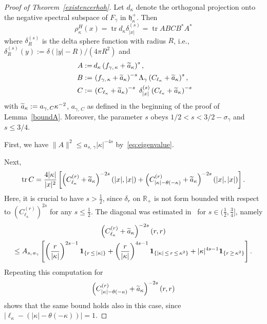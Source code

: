 \documentclass[10pt]{amsart}
\theoremstyle{definition}
\DeclareMathOperator{\tr}{tr}
\newcommand*\rz{\mathbb{R}}
\newcommand{\one}{\mathbf{1}}
\newcommand*\gh{\mathfrak{h}}
\newcommand*\ghpk{{\gh^+_\kappa}}
\let\oldtilde\tilde
\renewcommand*{\tilde}[1]{\mathchoice{\widetilde{#1}}{\widetilde{#1}}{\oldtilde{#1}}{\oldtilde{#1}}}
\begin{document}
\begin{proof}[{Proof of Theorem~\ref{existencerhoh}}]
Let $d_\kappa$ denote the orthogonal projection onto the negative spectral subspace of $F_\gamma$ in $\ghpk$. Then
\[
\rho_{\kappa}^H(x) = \tr d_\kappa \delta^{(s)}_{|x|} = \tr ABCB^*A^*
\]
where $\delta^{(s)}_R$ is the delta sphere function with radius $R$, i.e., $\delta^{(s)}_R(y):=\delta(|y|-R)/(4\pi R^2)$ and
\begin{equation}
\begin{split}
A:=\,&d_\kappa\left(f_{\gamma,\,\kappa}+\tilde a_\kappa\right)^s,\\
B:=\,&\left(f_{\gamma,\,\kappa}+\tilde a_\kappa\right)^{-s}\Lambda_\gamma\left(C_{\ell_\kappa}+\tilde a_\kappa\right)^s,\\\
C:=\,&\left(C_{\ell_\kappa}+\tilde a_\kappa\right)^{-s}\ \delta_{|x|}^{(s)} \left(C_{\ell_\kappa}+\tilde a_\kappa\right)^{-s}
\end{split}
\end{equation}
with $\tilde a_\kappa:=a_{\gamma,\,C}\kappa^{-2}$, $a_{\gamma,\,C}$ as defined in the beginning of the proof of Lemma~\ref{boundA}. Moreover, the parameter $s$ obeys $1/2<s<3/2-\sigma_\gamma$ and $s\leq3/4$.

First, we have $\|A\|^2\leq a_{s,\,\gamma} |\kappa|^{-4s}$ by~\eqref{eq:eigenvalue}.

Next,
\[
\tr C=\frac{4|\kappa|}{|x|^2}\left[\left(C_{\ell_\kappa}^{(r)}+\tilde a_\kappa\right)^{-2s}(|x|,|x|) + \left(C_{|\kappa|-\theta(-\kappa)}^{(r)}+\tilde a_\kappa\right)^{-2s}(|x|,|x|)\right].
\]
Here, it is crucial to have $s>\tfrac12$, since $\delta_r$ on $\rz_+$ is not form bounded with respect to $(C_{\ell_\kappa}^{(r)})^{2s}$ for any $s\leq\tfrac12$. The diagonal was estimated in~\cite[Lemma~A.2]{Franketal2020P} for $s\in(\tfrac12,\tfrac34]$, namely
\begin{multline*}
\left(C_{\ell_\kappa}^{(r)}+\tilde a_\kappa\right)^{-2s}(r,r) \\
\leq A_{s,\,a_\gamma}\left[\left(\frac{r}{|\kappa|}\right)^{2s-1}\one_{\left\{r\,\leq\,|\kappa|\right\}} + \left(\frac{r}{|\kappa|}\right)^{4s-1}\one_{\left\{|\kappa|\,\leq\,r\,\leq\,\kappa^2\right\}} + |\kappa|^{4s-1}\one_{\left\{r\,\geq\,\kappa^2\right\}}\right].
\end{multline*}
Repeating this computation for
\[
\left(C_{|\kappa|-\theta(-\kappa)}^{(r)}+\tilde a_\kappa\right)^{-2s}(r,r)
\]
shows that the same bound holds also in this case, since $|\ell_\kappa-(|\kappa|-\theta(-\kappa))|=1$.


\end{proof}
\end{document}
